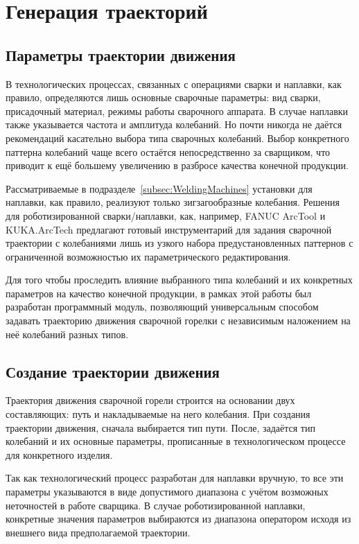 \chapter{Генерация траекторий}


\section{Параметры траектории движения} \label{sec:TrajectoryParameters}
В технологических процессах, связанных с операциями сварки и наплавки, как правило, определяются лишь основные сварочные параметры: вид сварки, присадочный материал, режимы работы сварочного аппарата.
В случае наплавки также указывается частота и амплитуда колебаний.
Но почти никогда не даётся рекомендаций касательно выбора типа сварочных колебаний.
Выбор конкретного паттерна колебаний чаще всего остаётся непосредственно за сварщиком, что приводит к ещё большему увеличению в разбросе качества конечной продукции.

Рассматриваемые в подразделе~\ref{subsec:WeldingMachines} установки для наплавки, как правило, реализуют только зигзагообразные колебания.
Решения для роботизированной сварки/наплавки, как, например, FANUC ArcTool и KUKA.ArcTech предлагают готовый инструментарий для задания сварочной траектории с колебаниями лишь из узкого набора предустановленных паттернов с ограниченной возможностью их параметрического редактирования.

Для того чтобы проследить влияние выбранного типа колебаний и их конкретных параметров на качество конечной продукции, в рамках этой работы был разработан программный модуль, позволяющий универсальным способом задавать траекторию движения сварочной горелки с независимым наложением на неё колебаний разных типов.


\section{Создание траектории движения}
Траектория движения сварочной горели строится на основании двух составляющих: путь и накладываемые на него колебания.
При создания траектории движения, сначала выбирается тип пути.
После, задаётся тип колебаний и их основные параметры, прописанные в технологическом процессе для конкретного изделия.

Так как технологический процесс разработан для наплавки вручную, то все эти параметры указываются в виде допустимого диапазона с учётом возможных неточностей в работе сварщика.
В случае роботизированной наплавки, конкретные значения параметров выбираются из диапазона оператором исходя из внешнего вида предполагаемой траектории.

